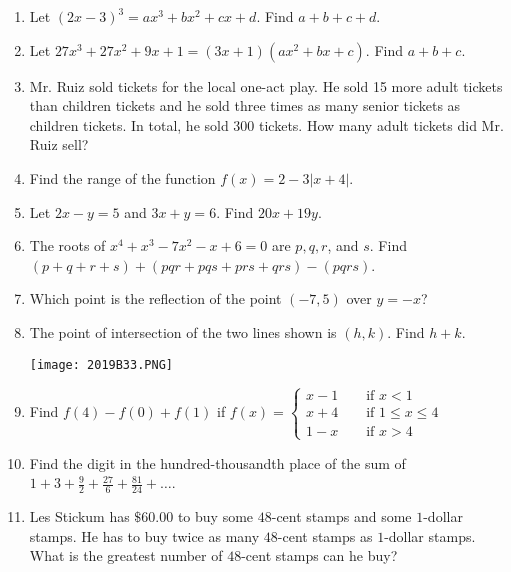 \documentclass[../uilmath.tex]{subfiles}
\begin{document}
\begin{enumerate}[label=\bfseries\arabic*.]
        \item %
        Let $(2x-3)^3=ax^3+bx^2+cx+d$. Find $a+b+c+d$.

        \item %
        Let $27x^3+27x^2+9x+1=(3x+1)(ax^2+bx+c)$. Find $a+b+c$.

        \item %
        Mr. Ruiz sold tickets for the local one-act play. He sold 15 more adult tickets than children tickets and he sold three times as many senior tickets as children tickets. In total, he sold 300 tickets. How many adult tickets did Mr. Ruiz sell?

        \item %
        Find the range of the function $f(x)=2-3|x+4|$.

        \item %
        Let $2x-y=5$ and $3x+y=6$. Find $20x+19y$.

        \item %
        The roots of $x^4+x^3-7x^2-x+6=0$ are $p,q,r$, and $s$. Find $(p+q+r+s)+(pqr+pqs+prs+qrs)-(pqrs)$.

        \item %
        Which point is the reflection of the point $(-7,5)$ over $y=-x$?

        \item %
        The point of intersection of the two lines shown is $(h,k)$. Find $h+k$.
        \begin{center}
            \texttt{[image: 2019B33.PNG]}
        \end{center}

        \item %
        Find $f(4)-f(0)+f(1)$ if $f(x)=\begin{cases}
            x-1 \qquad \text{if } x<1\\
            x+4 \qquad \text{if } 1\leq x\leq 4\\
            1-x \qquad \text{if } x>4
        \end{cases}$

        \item %
        Find the digit in the hundred-thousandth place of the sum of $1+3+\frac{9}{2}+\frac{27}{6}+\frac{81}{24}+\dots$.

        \item %
        Les Stickum has $\$60.00$ to buy some $48$-cent stamps and some $1$-dollar stamps. He has to buy twice as many $48$-cent stamps as $1$-dollar stamps. What is the greatest number of $48$-cent stamps can he buy?


\end{enumerate}
\end{document}
